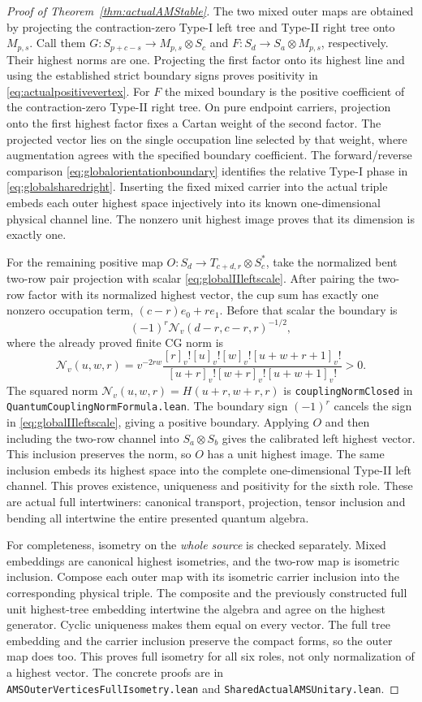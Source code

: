 \documentclass[10pt,a4paper]{article}
\newcommand{\qf}[1]{[#1]_v!}
\newcommand{\lean}[1]{{\small\nolinkurl{#1}}}
\newenvironment{revision}{\begingroup}{\endgroup}
\begin{document}
\begin{revision}
\begin{proof}[Proof of Theorem~\ref{thm:actualAMStable}]
The two mixed outer maps are obtained by projecting the
contraction-zero Type-I left tree and Type-II right tree onto
$M_{p,s}$. Call them $G:S_{p+c-s}\to M_{p,s}\otimes S_c$ and
$F:S_d\to S_a\otimes M_{p,s}$, respectively. Their highest norms are one. Projecting the first
factor onto its highest line and using the established strict boundary
signs proves positivity in \eqref{eq:actualpositivevertex}.
For $F$ the mixed boundary is the positive coefficient of the
contraction-zero Type-II right tree. On pure endpoint carriers, projection
onto the first highest factor fixes a Cartan weight of the second factor.
The projected vector lies on the single occupation line selected by
that weight, where augmentation agrees with the specified boundary
coefficient. The forward/reverse comparison
\eqref{eq:globalorientationboundary} identifies the relative Type-I
phase in \eqref{eq:globalsharedright}. Inserting the fixed mixed carrier into the actual
triple embeds each outer highest space injectively into its known
one-dimensional physical channel line. The nonzero unit highest
image proves that its dimension is exactly one.

For the remaining positive map
$O:S_d\to T_{c+d,r}\otimes S_c^*$, take the normalized bent two-row
pair projection with scalar \eqref{eq:globalIIleftscale}.
After pairing the two-row factor with its normalized highest vector,
the cup sum has exactly one nonzero occupation term,
$(c-r)e_0+r e_1$. Before that scalar the boundary is
\[
 (-1)^r\mathcal N_v(d-r,c-r,r)^{-1/2},
\]
where the already proved finite CG norm is
\[
 \mathcal N_v(u,w,r)=v^{-2rw}
 \frac{\qf{r}\qf{u}\qf{w}\qf{u+w+r+1}}
 {\qf{u+r}\qf{w+r}\qf{u+w+1}}>0.
\]
The squared norm $\mathcal N_v(u,w,r)=H(u+r,w+r,r)$ is
\lean{couplingNormClosed} in \lean{QuantumCouplingNormFormula.lean}. The boundary sign $(-1)^r$
cancels the sign in \eqref{eq:globalIIleftscale}, giving a positive
boundary. Applying $O$ and then including the two-row channel into
$S_a\otimes S_b$ gives the calibrated left highest vector. This
inclusion preserves the norm, so $O$ has a unit highest image. The same inclusion embeds its
highest space into the complete one-dimensional Type-II left channel.
This proves existence, uniqueness and positivity for the sixth role.
These are actual full intertwiners: canonical transport, projection,
tensor inclusion and bending all intertwine the entire presented
quantum algebra.

For completeness, isometry on the \emph{whole source} is checked
separately. Mixed embeddings are canonical highest isometries, and
the two-row map is isometric inclusion. Compose each outer map with
its isometric carrier inclusion into the corresponding physical
triple. The composite and the previously constructed full unit
highest-tree embedding intertwine the algebra and agree on the
highest generator. Cyclic uniqueness makes them equal on every
vector. The full tree embedding and the carrier inclusion preserve
the compact forms, so the outer map does too. This proves full
isometry for all six roles, not only normalization of a highest
vector. The concrete proofs are in
\lean{AMSOuterVerticesFullIsometry.lean} and
\lean{SharedActualAMSUnitary.lean}.


\end{proof}
\end{revision}
\end{document}

